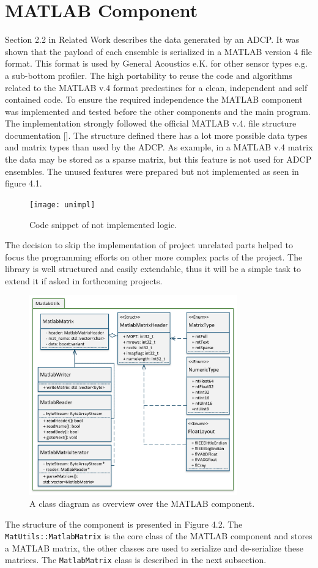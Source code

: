 \section{MATLAB Component}
Section 2.2 in Related Work describes the data generated by an ADCP. It was shown that the payload of each ensemble is serialized in a MATLAB version 4 file format. This format is used by General Acoustics e.K. for other sensor types e.g. a sub-bottom profiler. The high portability to reuse the code and algorithms related to the MATLAB v.4 format predestines for a clean, independent and self contained code. To ensure the required independence the MATLAB component was implemented and tested before the other components and the main program.\\
The implementation strongly followed the official MATLAB v.4. file structure documentation []. The structure defined there has a lot more possible data types and matrix types than used by the ADCP. As example, in a MATLAB v.4 matrix the data may be stored as a sparse matrix, but this feature is not used for ADCP ensembles. The unused features were prepared but not implemented as seen in figure 4.1.
\begin{figure}[h]
\centering
      \texttt{[image: unimpl]}
        \caption{Code snippet of not implemented logic.}
\end{figure}
The decision to skip the implementation of project unrelated parts helped to focus the programming efforts on other more complex parts of the project. The library is well structured and easily extendable, thus it will be a simple task to extend it if asked in forthcoming projects.
\begin{figure}[h]
\centering
      \includegraphics[width=0.8\textwidth]{mlab}
        \caption{A class diagram as overview over the MATLAB component.}
\end{figure}
The structure of the component is presented in Figure 4.2. The \texttt{MatUtils::MatlabMatrix} is the core class of the MATLAB component and stores a MATLAB matrix, the other classes are used to serialize and de-serialize these matrices. The \texttt{MatlabMatrix} class is described in the next subsection.
